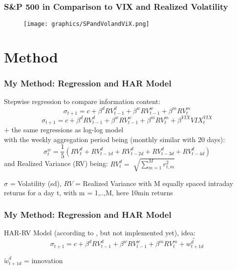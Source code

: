 \documentclass[aspectratio=169]{beamer}
\begin{document}
\begin{frame}
\frametitle{S\&P 500 in Comparison to VIX and Realized Volatility}
	\begin{figure}
	\centering
	\texttt{[image: graphics/SPandVolandViX.png]}
	\end{figure}
\end{frame}

\section{Method}


\begin{frame}
\frametitle{My Method: Regression and HAR Model}
%
Stepwise regression to compare information content:
	\begin{equation}
	\sigma_{t+1} = c + \beta^{d} RV^{d}_{t-1} + \beta^{w} RV^{w}_{t-1} + \beta^{m} RV^{m}_{t} 
	\end{equation}	
	\begin{equation}
	\sigma_{t+1} = c + \beta^{d} RV^{d}_{t-1} + \beta^{w} RV^{w}_{t-1} + \beta^{m} RV^{m}_{t} + \beta^{VIX} VIX^{VIX}_{t}
	\end{equation}
$+$ the same regressions as log-log model\\
with the weekly aggregation period being (monthly similar with 20 days):
	\begin{equation*}
	\sigma^{w}_{t} = \frac{1}{5} (RV^{d}_{t} + RV^{d}_{t-1d} + RV^{d}_{t-2d} + RV^{d}_{t-3d} + RV^{d}_{t-4d})
	\end{equation*}
and Realized Variance (RV) being: $	RV^{d}_{t} = \sqrt[]{\sum_{m=1}^{M} r^{2}_{t,m}} $\\
%
\begin{footnotesize}
$\sigma$ = Volatility (sd), $RV$ = Realized Variance with M equally spaced intraday returns for a day t, with m = 1,..,M, here 10min returns
\end{footnotesize}
%
\end{frame}

\begin{frame}
\frametitle{My Method: Regression and HAR Model}
HAR-RV Model (according to \textcite{corsi2009}, but not implemented yet), idea:
\begin{equation}
	\sigma_{t+1} = c + \beta^{d} RV^{d}_{t-1} + \beta^{w} RV^{w}_{t-1} + \beta^{m} RV^{m}_{t} + \tilde{w^{d}_{t+1d}}
	\end{equation}	
\begin{footnotesize}
$\tilde{w}^{d}_{t+1d}$ = innovation
\end{footnotesize}

\end{frame}
\end{document}
